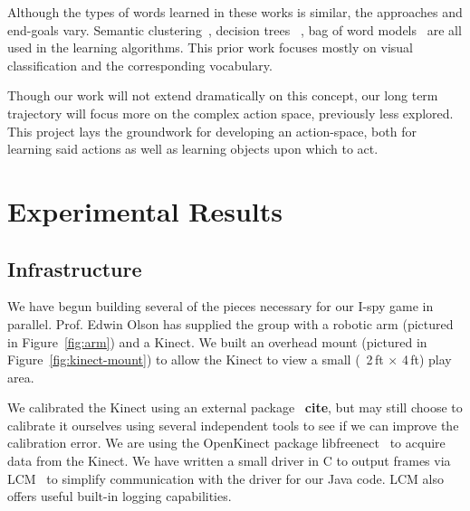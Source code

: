 \documentclass[11pt]{article}
\newcommand{\xxx}[1]{{\bf \color{red} #1}}
\begin{document}
Although the types of words learned in these works is similar, the approaches and
end-goals vary. Semantic clustering~\cite{zambuto2010visually}, decision trees
~\cite{gold2009robotic}, bag of word models~\cite{roy2002learning} are all used
in the learning algorithms. This prior work focuses mostly on visual classification
and the corresponding vocabulary.

Though our work will not extend dramatically on this concept, our long term
trajectory will focus more on the complex action space, previously less explored.
This project lays the groundwork for developing an action-space, both for
learning said actions as well as learning objects upon which to act.

\section{Experimental Results}
\subsection{Infrastructure}
We have begun building several of the pieces necessary for our I-spy
game in parallel.  Prof. Edwin Olson has supplied the group with a robotic
arm (pictured in Figure~\ref{fig:arm}) and a Kinect.  We built an
overhead mount (pictured in Figure~\ref{fig:kinect-mount}) to allow the Kinect
to view a small (~2\,ft $\times$ 4\,ft) play area.

We calibrated the Kinect using an external package~\xxx{cite}, but may still
choose to calibrate it ourselves using several independent tools to see if we
can improve the calibration error. We are using the OpenKinect
package libfreenect~\cite{OpenKinect} to acquire data from the Kinect.  We have
written a small driver in C to output frames via LCM~\cite{huang2010} to simplify
communication with the driver for our Java code.  LCM also offers useful
built-in logging capabilities.
\end{document}
